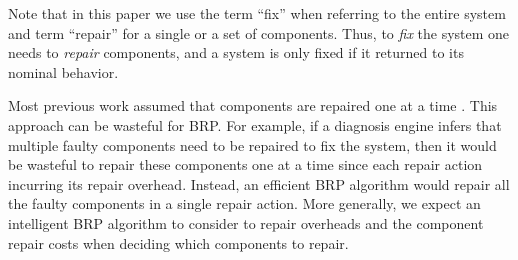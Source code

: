 \documentclass[letterpaper]{article}
\newcommand\meir[1]{\textcolor{red}{meir: #1}}
\begin{document}
Note that in this paper we use the term  ``fix'' when referring to the entire system and term ``repair'' for a single or a set of components.  Thus, 
to {\em fix} the system one needs to {\em repair} components, and a system is only fixed if it returned to its nominal behavior.



Most previous work assumed that components are repaired one at a time \cite{heckerman1995decision,friedrich1992choosing,Nyberg12,Torta14}. This approach can be wasteful for BRP. For example, if a diagnosis engine infers that multiple faulty components need to be repaired to fix the system, then it would be wasteful to repair these components one at a time since each repair action incurring its repair overhead. Instead, an efficient BRP algorithm would repair all the faulty components in a single repair action. More generally, we expect an intelligent BRP algorithm to consider to repair overheads and the component repair costs when deciding which components to repair. 
\end{document}
